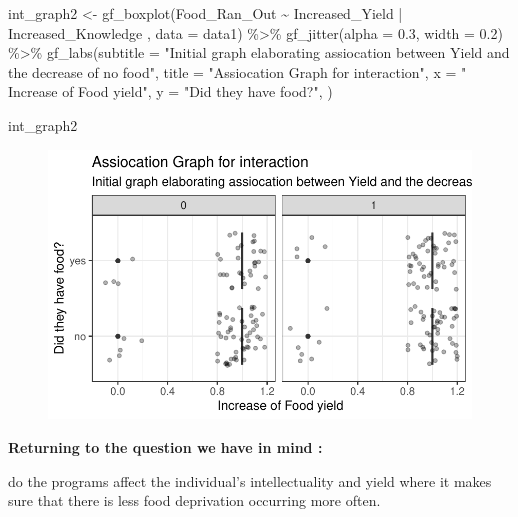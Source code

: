 \documentclass[
  letterpaper,
  DIV=11,
  numbers=noendperiod]{scrartcl}
\newenvironment{Shaded}{\begin{snugshade}}{\end{snugshade}}
\newcommand{\AttributeTok}[1]{\textcolor[rgb]{0.40,0.45,0.13}{#1}}
\newcommand{\FloatTok}[1]{\textcolor[rgb]{0.68,0.00,0.00}{#1}}
\newcommand{\FunctionTok}[1]{\textcolor[rgb]{0.28,0.35,0.67}{#1}}
\newcommand{\NormalTok}[1]{\textcolor[rgb]{0.00,0.23,0.31}{#1}}
\newcommand{\OtherTok}[1]{\textcolor[rgb]{0.00,0.23,0.31}{#1}}
\newcommand{\SpecialCharTok}[1]{\textcolor[rgb]{0.37,0.37,0.37}{#1}}
\newcommand{\StringTok}[1]{\textcolor[rgb]{0.13,0.47,0.30}{#1}}
\begin{document}
\begin{Shaded}
\begin{Highlighting}[]
\NormalTok{int\_graph2 }\OtherTok{\textless{}{-}} \FunctionTok{gf\_boxplot}\NormalTok{(Food\_Ran\_Out }\SpecialCharTok{\textasciitilde{}}\NormalTok{ Increased\_Yield }\SpecialCharTok{|}\NormalTok{ Increased\_Knowledge ,  }\AttributeTok{data =}\NormalTok{ data1) }\SpecialCharTok{\%\textgreater{}\%}
  \FunctionTok{gf\_jitter}\NormalTok{(}\AttributeTok{alpha =} \FloatTok{0.3}\NormalTok{, }\AttributeTok{width =} \FloatTok{0.2}\NormalTok{) }\SpecialCharTok{\%\textgreater{}\%}
   \FunctionTok{gf\_labs}\NormalTok{(}\AttributeTok{subtitle =} \StringTok{"Initial graph elaborating assiocation between Yield and the decrease of no food"}\NormalTok{,}
          \AttributeTok{title =} \StringTok{"Assiocation Graph for interaction"}\NormalTok{,}
          \AttributeTok{x =} \StringTok{" Increase of Food yield"}\NormalTok{,}
          \AttributeTok{y =} \StringTok{"Did they have food?"}\NormalTok{, }
\NormalTok{           )}

\NormalTok{int\_graph2}
\end{Highlighting}
\end{Shaded}

\begin{figure}[H]

{\centering \includegraphics{Empircal-Research-final_files/figure-pdf/unnamed-chunk-3-1.pdf}

}

\end{figure}

\textbf{Returning to the question we have in mind :}

do the programs affect the individual's intellectuality and yield where
it makes sure that there is less food deprivation occurring more often.
\end{document}
